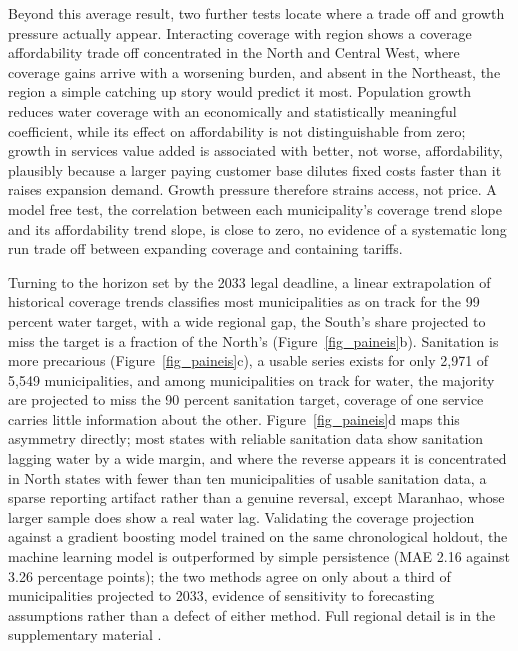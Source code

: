 \documentclass[preprint,12pt]{elsarticle}
\begin{document}
Beyond this average result, two further tests locate where a trade off and growth pressure actually appear. Interacting coverage with region shows a coverage affordability trade off concentrated in the North and Central West, where coverage gains arrive with a worsening burden, and absent in the Northeast, the region a simple catching up story would predict it most. Population growth reduces water coverage with an economically and statistically meaningful coefficient, while its effect on affordability is not distinguishable from zero; growth in services value added is associated with better, not worse, affordability, plausibly because a larger paying customer base dilutes fixed costs faster than it raises expansion demand. Growth pressure therefore strains access, not price. A model free test, the correlation between each municipality's coverage trend slope and its affordability trend slope, is close to zero, no evidence of a systematic long run trade off between expanding coverage and containing tariffs.

Turning to the horizon set by the 2033 legal deadline, a linear extrapolation of historical coverage trends classifies most municipalities as on track for the 99 percent water target, with a wide regional gap, the South's share projected to miss the target is a fraction of the North's (Figure~\ref{fig_paineis}b). Sanitation is more precarious (Figure~\ref{fig_paineis}c), a usable series exists for only 2,971 of 5,549 municipalities, and among municipalities on track for water, the majority are projected to miss the 90 percent sanitation target, coverage of one service carries little information about the other. Figure~\ref{fig_paineis}d maps this asymmetry directly; most states with reliable sanitation data show sanitation lagging water by a wide margin, and where the reverse appears it is concentrated in North states with fewer than ten municipalities of usable sanitation data, a sparse reporting artifact rather than a genuine reversal, except Maranhao, whose larger sample does show a real water lag. Validating the coverage projection against a gradient boosting model trained on the same chronological holdout, the machine learning model is outperformed by simple persistence (MAE 2.16 against 3.26 percentage points); the two methods agree on only about a third of municipalities projected to 2033, evidence of sensitivity to forecasting assumptions rather than a defect of either method. Full regional detail is in the supplementary material \citep{Figueredo2026Repo}.
\end{document}
